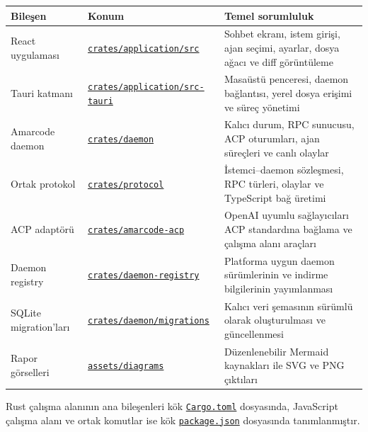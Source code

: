 \documentclass[
  turkish,
  10pt,
  a4paper,
]{article}
\begin{document}
\begin{longtable}[]{@{}lll@{}}
\toprule\noalign{}
Bileşen & Konum & Temel sorumluluk \\
\midrule\noalign{}
\endhead
\bottomrule\noalign{}
\endlastfoot
React uygulaması &
\href{https://github.com/amar-jay/amarcode/tree/main/crates/application/src}{\texttt{crates/application/src}}
& Sohbet ekranı, istem girişi, ajan seçimi, ayarlar, dosya ağacı ve diff
görüntüleme \\
Tauri katmanı &
\href{https://github.com/amar-jay/amarcode/tree/main/crates/application/src-tauri}{\texttt{crates/application/src-tauri}}
& Masaüstü penceresi, daemon bağlantısı, yerel dosya erişimi ve süreç
yönetimi \\
Amarcode daemon &
\href{https://github.com/amar-jay/amarcode/tree/main/crates/daemon}{\texttt{crates/daemon}}
& Kalıcı durum, RPC sunucusu, ACP oturumları, ajan süreçleri ve canlı
olaylar \\
Ortak protokol &
\href{https://github.com/amar-jay/amarcode/tree/main/crates/protocol}{\texttt{crates/protocol}}
& İstemci--daemon sözleşmesi, RPC türleri, olaylar ve TypeScript bağ
üretimi \\
ACP adaptörü &
\href{https://github.com/amar-jay/amarcode/tree/main/crates/amarcode-acp}{\texttt{crates/amarcode-acp}}
& OpenAI uyumlu sağlayıcıları ACP standardına bağlama ve çalışma alanı
araçları \\
Daemon registry &
\href{https://github.com/amar-jay/amarcode/tree/main/crates/daemon-registry}{\texttt{crates/daemon-registry}}
& Platforma uygun daemon sürümlerinin ve indirme bilgilerinin
yayımlanması \\
SQLite migration'ları &
\href{https://github.com/amar-jay/amarcode/tree/main/crates/daemon/migrations}{\texttt{crates/daemon/migrations}}
& Kalıcı veri şemasının sürümlü olarak oluşturulması ve güncellenmesi \\
Rapor görselleri &
\href{https://github.com/amar-jay/amarcode/tree/main/assets/diagrams}{\texttt{assets/diagrams}}
& Düzenlenebilir Mermaid kaynakları ile SVG ve PNG çıktıları \\
\end{longtable}

Rust çalışma alanının ana bileşenleri kök
\href{https://github.com/amar-jay/amarcode/blob/main/Cargo.toml}{\texttt{Cargo.toml}}
dosyasında, JavaScript çalışma alanı ve ortak komutlar ise kök
\href{https://github.com/amar-jay/amarcode/blob/main/package.json}{\texttt{package.json}}
dosyasında tanımlanmıştır.
\end{document}
